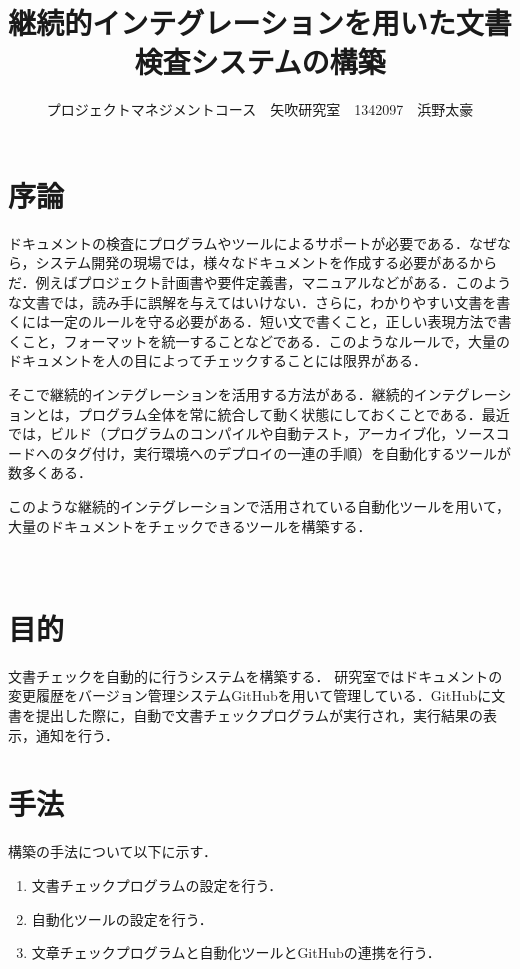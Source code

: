 \documentclass[uplatex,twocolumn,dvipdfmx]{jsarticle}
\title{\vspace{-5mm}\fontsize{14pt}{0pt}\selectfont 継続的インテグレーションを用いた文書検査システムの構築}
\author{\normalsize プロジェクトマネジメントコース　矢吹研究室　1342097　浜野太豪}
\date{}
\begin{document}
\fontsize{10.5pt}{\baselineskip}\selectfont
\maketitle





\section{序論}



\noindent

ドキュメントの検査にプログラムやツールによるサポートが必要である．なぜなら，システム開発の現場では，様々なドキュメントを作成する必要があるからだ．例えばプロジェクト計画書や要件定義書，マニュアルなどがある．このような文書では，読み手に誤解を与えてはいけない．さらに，わかりやすい文書を書くには一定のルールを守る必要がある．短い文で書くこと，正しい表現方法で書くこと，フォーマットを統一することなどである．このようなルールで，大量のドキュメントを人の目によってチェックすることには限界がある．

そこで継続的インテグレーションを活用する方法がある．継続的インテグレーションとは，プログラム全体を常に統合して動く状態にしておくことである．最近では，ビルド（プログラムのコンパイルや自動テスト，アーカイブ化，ソースコードへのタグ付け，実行環境へのデプロイの一連の手順）を自動化するツールが数多くある\cite{1}．

このような継続的インテグレーションで活用されている自動化ツールを用いて，大量のドキュメントをチェックできるツールを構築する．








　



\noindent


\section{目的}
文書チェックを自動的に行うシステムを構築する．
研究室ではドキュメントの変更履歴をバージョン管理システムGitHubを用いて管理している．GitHubに文書を提出した際に，自動で文書チェックプログラムが実行され，実行結果の表示，通知を行う．

\section{手法}
構築の手法について以下に示す．
\begin{enumerate}
\item 文書チェックプログラムの設定を行う．
\item 自動化ツールの設定を行う．
\item 文章チェックプログラムと自動化ツールとGitHubの連携を行う．
\end{enumerate}
\end{document}

